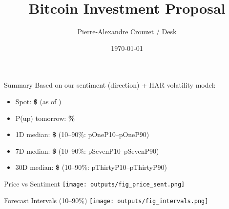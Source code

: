 \documentclass[11pt]{beamer}
\title{Bitcoin Investment Proposal}
\author{Pierre-Alexandre Crouzet / Desk}
\date{\today}
\begin{document}

\begin{frame}
  \titlepage
\end{frame}

\begin{frame}{Summary}
  Based on our sentiment (direction) + HAR volatility model:
  \begin{itemize}
    \item Spot: \textbf{\$ \spotUSD} \hfill (as of \reportDate)
    \item P(up) tomorrow: \textbf{\probUpOneDay\%}
    \item 1D median: \textbf{\$ \pOneMed} (10--90\%: \csname pOneP10\endcsname--\csname pOneP90\endcsname)
\item 7D median: \textbf{\$ \pSevenMed} (10--90\%: \csname pSevenP10\endcsname--\csname pSevenP90\endcsname)
\item 30D median: \textbf{\$ \pThirtyMed} (10--90\%: \csname pThirtyP10\endcsname--\csname pThirtyP90\endcsname)
  \end{itemize}
\end{frame}

\begin{frame}{Price vs Sentiment}
  \centering
  \texttt{[image: outputs/fig\_price\_sent.png]}
\end{frame}

\begin{frame}{Forecast Intervals (10--90\%)}
  \centering
  \texttt{[image: outputs/fig\_intervals.png]}
\end{frame}
\end{document}
